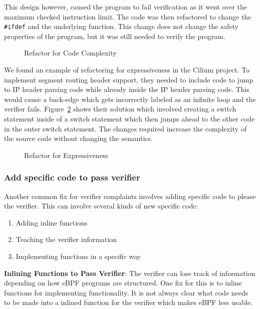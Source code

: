 This design however, caused the program to fail verification as it went over the maximum checked instruction limit.
The code was then refactored to change the \texttt{\#ifdef} and the underlying function.
This change does not change the safety properties of the program, but it was still needed to verify the program.

\begin{figure}
    
    \caption{Refactor for Code Complexity}
    \label{fig:refactor-fix}
\end{figure}


We found an example of refactoring for expressiveness in the Cilium project.
To implement segment routing header support, they needed to include code to jump to IP header parsing code while already inside the IP header parsing code.
This would cause a back-edge which gets incorrectly labeled as an infinite loop and the verifier fails.
Figure~\ref{fig:switch} shows their solution which involved creating a switch statement inside of a switch statement which then jumps ahead to the other code in the outer switch statement.
The changes required increase the complexity of the source code without changing the semantics.

\begin{figure}
    
    \caption{Refactor for Expressiveness}
    \label{fig:switch}
\end{figure}

\subsubsection{Add specific code to pass verifier}
\label{motivation:add-code}
Another common fix for verifier complaints involves adding specific code to please
    the verifier.
This can involve several kinds of new specific code:

\begin{enumerate}
    \item Adding inline functions
    \item Teaching the verifier information
    \item Implementing functions in a specific way
\end{enumerate}

\noindent\textbf{Inlining Functions to Pass Verifier}:
The verifier can lose track of information depending on how eBPF programs are structured.
One fix for this is to inline functions for implementing functionality.
It is not always clear what code needs to be made into a inlined function for the verifier
    which makes eBPF less usable.

